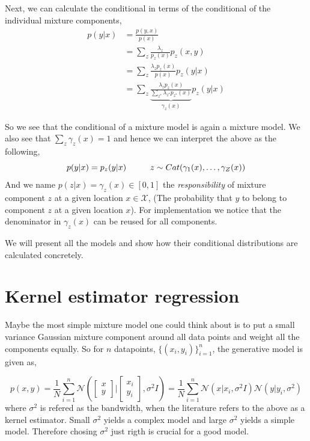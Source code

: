 Next, we can calculate the conditional in terms of the conditional of the individual mixture
components, 
\begin{align}
    p(y|x) &= \frac{p(y,x)}{p(x)}\\
    &= \sum_{z} \frac{\lambda_z}{p_z(x)} p_z(x,y)\\
    &=  \sum_{z}  \frac{\lambda_z p_z(x)}{p(x)}p_z(y|x)\\
    &=  \sum_{z}  \underbrace{ \frac{\lambda_z p_z(x)}{\sum_{z^*} \lambda_{z^*} p_{z^*}(x)}}_{\gamma_z(x)} p_z(y|x)
\end{align}

So we see that the conditional of a mixture model is again a mixture model. 
We also see that $\sum_z \gamma_z(x) = 1$ and hence we can interpret the above as the following, 
$$p(y|x) = p_z(y|x)  \hspace*{1cm} z \sim Cat(\gamma_1(x), \dots, \gamma_Z(x)) $$ And we name
$p(z|x) = \gamma_z(x) \in [0,1]$ the \textit{responsibility} of mixture component $z$ at a given
location $x \in \mathcal{X}$, (The probability that $y$ to belong to component $z$ at a given
location $x$). For implementation we notice that the denominator in $\gamma_z(x)$ can be reused for
all components. 

We will present all the models and show how their conditional distributions are calculated concretely.


\section{Kernel estimator regression}
Maybe the most simple mixture model one could think about is to put a small variance Gaussian mixture
component around all data points and weight all the components equally. So for $n$ datapoints,
$\{(x_i,y_i)\}_{i=1}^n$, the generative model is given as, 

$$p(x,y) = \frac{1}{N} \sum_{i=1}^n \mathcal{N}\left(\begin{bmatrix}x\\y\end{bmatrix} |
\begin{bmatrix}x_i\\y_i\end{bmatrix}, \sigma^2 I \right) = \frac{1}{N} \sum_{i=1}^n 
\mathcal{N}(x|x_i, \sigma^2 I)\mathcal{N}(y|y_i, \sigma^2) $$
where $\sigma^2$ is refered as the bandwidth, when the literature refers to the above as a kernel estimator. 
Small $\sigma^2$ yields a complex model and large $\sigma^2$ yields a simple model. Therefore chosing $\sigma^2$
just rigth is crucial for a good model. 



